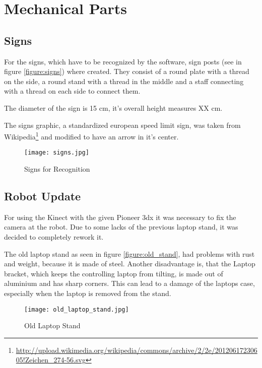 \chapter{Mechanical Parts}
\graphicspath{{./Mechanical/img/}}



\section{Signs}

For the signs, which have to be recognized by the software, sign posts (see in figure \vref{figure:signs}) where created.
They consist of a round plate with a thread on the side, a round stand with a thread in the middle and a staff connecting
with a thread on each side to connect them.

The diameter of the sign is 15 cm, it's overall height measures XX cm.

The signs graphic, a standardized european speed limit sign, was taken from 
Wikipedia\footnote{\url{http://upload.wikimedia.org/wikipedia/commons/archive/2/2e/20120617230605!Zeichen_274-56.svg}}
and modified to have an arrow in it's center. 

 \begin{figure}[htp]
\begin{center}
  \texttt{[image: signs.jpg]}
  \caption{Signs for Recognition}
  \label{figure:signs}
\end{center}
\end{figure}

\section{Robot Update}

For using the Kinect with the given Pioneer 3dx it was necessary to fix the camera at the robot.
Due to some lacks of the previous laptop stand, it was decided to completely rework it.

The old laptop stand as seen in figure \vref{figure:old_stand}, had problems with rust and weight,
because it is made of steel. Another disadvantage is, that the Laptop bracket, which keeps the 
controlling laptop from tilting, is made out of aluminium and has sharp corners. This can lead
to a damage of the laptops case, especially when the laptop is removed from the stand. 

\begin{figure}[htp]
\begin{center}
  \texttt{[image: old\_laptop\_stand.jpg]}
  \caption{Old Laptop Stand}
  \label{figure:old_stand}
\end{center}
\end{figure}


